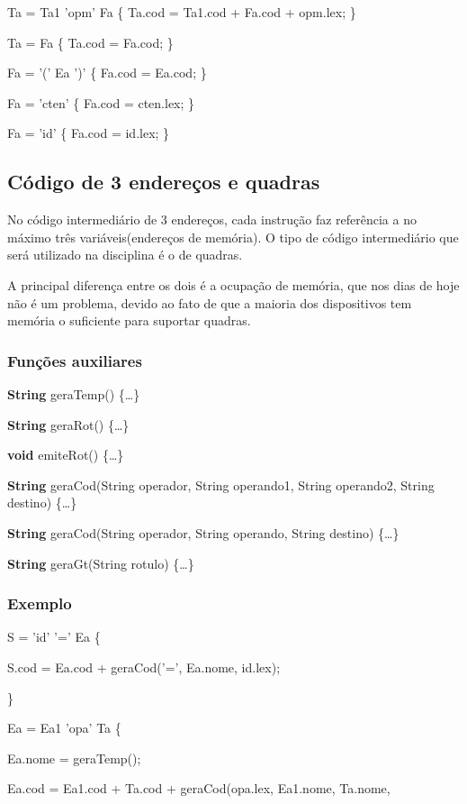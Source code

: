 \documentclass[11pt]{article}
\begin{document}
Ta = Ta1 'opm' Fa \{ Ta.cod = Ta1.cod + Fa.cod + opm.lex; \}

Ta = Fa \{ Ta.cod = Fa.cod; \}

Fa = '(' Ea ')' \{ Fa.cod = Ea.cod; \}

Fa = 'cten' \{ Fa.cod = cten.lex; \}

Fa = 'id' \{ Fa.cod = id.lex; \}

\subsection{Código de 3 endereços e quadras}
\label{sec:org37465e8}
No código intermediário de 3 endereços, cada instrução faz
referência a no máximo três variáveis(endereços de memória).
O tipo de código intermediário que será utilizado na disciplina
é o de quadras.

A principal diferença entre os dois é a ocupação de memória, que
nos dias de hoje não é um problema, devido ao fato de que a maioria
dos dispositivos tem memória o suficiente para suportar quadras.

\subsubsection{Funções auxiliares}
\label{sec:orga44d705}
\textbf{String} geraTemp() \{\ldots{}\}

\textbf{String} geraRot() \{\ldots{}\}

\textbf{void} emiteRot() \{\ldots{}\}

\textbf{String} geraCod(String operador, String operando1, String
operando2, String destino) \{\ldots{}\}

\textbf{String} geraCod(String operador, String operando, String destino)
\{\ldots{}\}

\textbf{String} geraGt(String rotulo) \{\ldots{}\}


\subsubsection{Exemplo}
\label{sec:orgb50a82b}

S = 'id' '=' Ea \{

S.cod = Ea.cod + geraCod('=', Ea.nome, id.lex);

\}

Ea = Ea1 'opa' Ta \{ 

Ea.nome = geraTemp();

Ea.cod = Ea1.cod + Ta.cod + geraCod(opa.lex, Ea1.nome,
Ta.nome,
\end{document}
